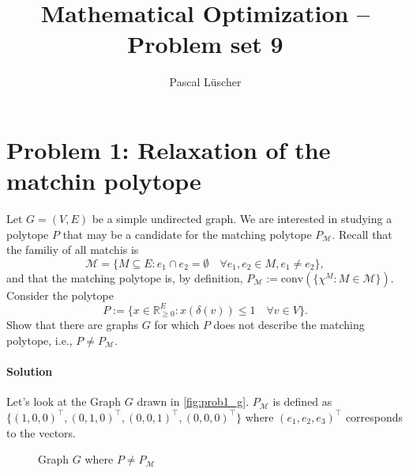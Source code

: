 \documentclass[12pt, a4]{article}
\author{Pascal Lüscher}
\title{Mathematical Optimization – Problem set 9}
\begin{document}
\section{Problem 1: Relaxation of the matchin polytope}
Let $G=(V,E)$ be a simple undirected graph. We are interested in studying a polytope $P$ that may be a candidate for the matching polytope $P_\mathcal{M}$. Recall that the familiy of all matchis is
$$
\mathcal{M}=\{M\subseteq E : e_1 \cap e_2 = \emptyset \quad \forall e_1,e_2 \in M, e_1 \neq e_2\} ,
$$
and that the matching polytope is, by definition, $P_\mathcal{M} := \text{conv}(\{\chi ^M : M \in \mathcal{M}\})$. Consider the polytope 
$$
P := \{x \in \mathbb{R}^E_{\geq 0}:x(\delta(v))\leq1 \quad\forall v \in V\}.
$$
Show that there are graphs $G$ for which $P$ does not describe the matching polytope, i.e., $P \neq P_\mathcal{M}$.

\paragraph{Solution}
Let's look at the Graph $G$ drawn in \autoref{fig:prob1_g}. $P_\mathcal{M}$ is defined as $\{(1,0,0)^\top, (0,1,0)^\top, (0,0,1)^\top, (0,0,0)^\top\}$ where $(e_1,e_2,e_3)^\top$ corresponds to the vectors.

\begin{figure}[h]
	\centering	
	\caption{Graph $G$ where $P \neq P_\mathcal{M}$}
	\label{fig:prob1_g}
\end{figure}
\end{document}
